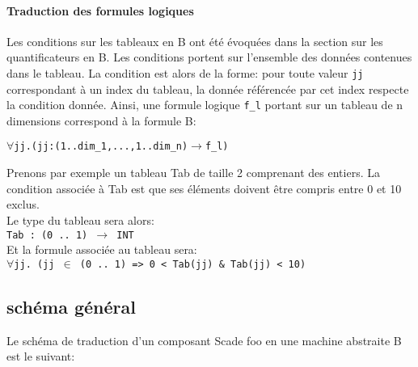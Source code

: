 \paragraph{Traduction des formules logiques}
Les conditions sur les tableaux en B ont été évoquées dans la section sur les
quantificateurs en B. Les conditions portent sur l'ensemble des données
contenues dans le tableau. La condition est alors de la forme: pour toute valeur
\texttt{jj} correspondant à un index du tableau, la donnée référencée par cet index
respecte la condition donnée. Ainsi, une formule logique \texttt{f\_l} portant sur un
tableau de n dimensions correspond à la formule B: 
\begin{alltt}
\(\forall \)jj. (jj : (1..dim_1, ..., 1..dim_n) \(\rightarrow\) f\_l)
\end{alltt}

Prenons par exemple un tableau Tab de taille 2 comprenant des entiers. La condition
associée à Tab est que ses éléments doivent être compris entre 0 et 10 exclus.\\
Le type du tableau sera alors: \\
\texttt{Tab : (0 .. 1) $\rightarrow$ INT }\\
Et la formule associée au tableau sera: \\
\texttt{$\forall$jj. (jj $\in$ (0 .. 1) => 0 < Tab(jj) \& Tab(jj) < 10)}

\subsection{schéma général}

Le schéma de traduction d'un composant Scade foo en une machine abstraite B est
le suivant:

